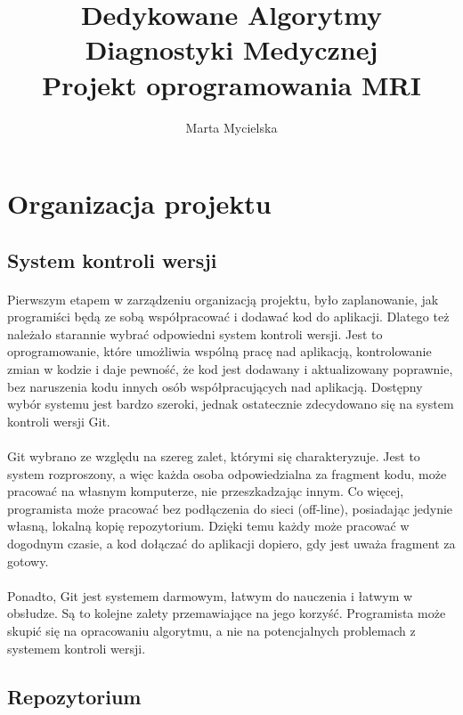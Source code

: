 \documentclass[12]{article}
\title{Dedykowane Algorytmy Diagnostyki Medycznej\\ \small{Projekt oprogramowania MRI}}
\author{Marta Mycielska}
\begin{document}
	
	\maketitle
	\newpage
	\tableofcontents
	\newpage
	\section{Organizacja projektu}
	\subsection{System kontroli wersji}
	\paragraph{}
	Pierwszym etapem w zarządzeniu organizacją projektu, było zaplanowanie, jak programiści będą ze sobą współpracować i dodawać kod do aplikacji. Dlatego też należało starannie wybrać odpowiedni system kontroli wersji. Jest to oprogramowanie, które umożliwia wspólną pracę nad aplikacją, kontrolowanie zmian w kodzie i daje pewność, że kod jest dodawany i aktualizowany poprawnie, bez naruszenia kodu innych osób współpracujących nad aplikacją. Dostępny wybór systemu jest bardzo szeroki, jednak ostatecznie zdecydowano się na system kontroli wersji Git.
	\paragraph{}
	Git wybrano ze względu na szereg zalet, którymi się charakteryzuje. Jest to system rozproszony, a więc każda osoba odpowiedzialna za fragment kodu, może pracować na własnym komputerze, nie przeszkadzając innym. Co więcej, programista może pracować bez podłączenia do sieci (off-line), posiadając jedynie własną, lokalną kopię repozytorium. Dzięki temu każdy może pracować w dogodnym czasie, a kod dołączać do aplikacji dopiero, gdy jest uważa fragment za gotowy.
	\paragraph{}
	Ponadto, Git jest systemem darmowym, łatwym do nauczenia i łatwym w obsłudze. Są to kolejne zalety przemawiające na jego korzyść. Programista może skupić się na opracowaniu algorytmu, a nie na potencjalnych problemach z systemem kontroli wersji.

	\subsection{Repozytorium}
\end{document}
